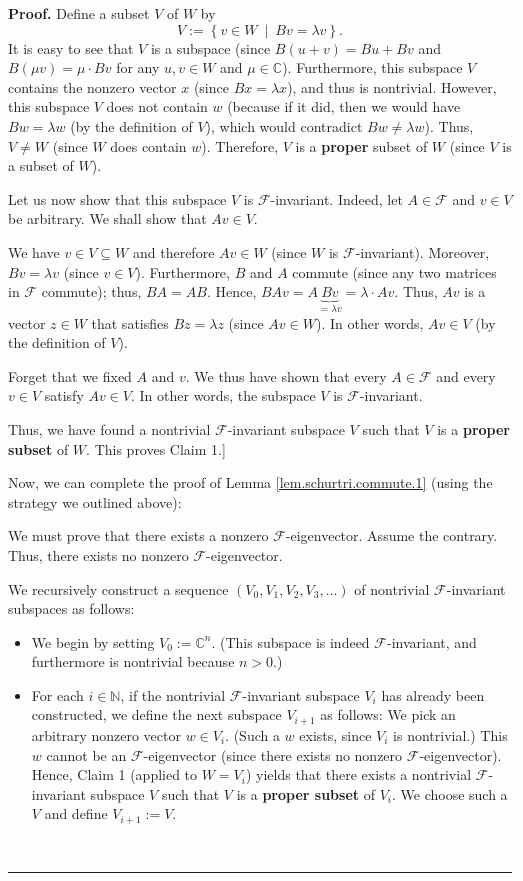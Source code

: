 \documentclass[numbers=enddot,12pt,final,onecolumn,notitlepage]{scrartcl}%
\numberwithin{exer}{subsection}
\theoremstyle{definition}
\newenvironment{proof}[1][Proof]{\noindent\textbf{#1.} }{\ \rule{0.5em}{0.5em}}
\begin{document}
\begin{proof}
Define a subset $V$ of $W$ by
\[
V:=\left\{  v\in W\ \mid\ Bv=\lambda v\right\}  .
\]
It is easy to see that $V$ is a subspace (since $B\left(  u+v\right)  =Bu+Bv$
and $B\left(  \mu v\right)  =\mu\cdot Bv$ for any $u,v\in W$ and $\mu
\in\mathbb{C}$). Furthermore, this subspace $V$ contains the nonzero vector
$x$ (since $Bx=\lambda x$), and thus is nontrivial. However, this subspace $V$
does not contain $w$ (because if it did, then we would have $Bw=\lambda w$ (by
the definition of $V$), which would contradict $Bw\neq\lambda w$). Thus,
$V\neq W$ (since $W$ does contain $w$). Therefore, $V$ is a \textbf{proper}
subset of $W$ (since $V$ is a subset of $W$).

Let us now show that this subspace $V$ is $\mathcal{F}$-invariant. Indeed, let
$A\in\mathcal{F}$ and $v\in V$ be arbitrary. We shall show that $Av\in V$.

We have $v\in V\subseteq W$ and therefore $Av\in W$ (since $W$ is
$\mathcal{F}$-invariant). Moreover, $Bv=\lambda v$ (since $v\in V$).
Furthermore, $B$ and $A$ commute (since any two matrices in $\mathcal{F}$
commute); thus, $BA=AB$. Hence, $BAv=A\underbrace{Bv}_{=\lambda v}%
=\lambda\cdot Av$. Thus, $Av$ is a vector $z\in W$ that satisfies $Bz=\lambda
z$ (since $Av\in W$). In other words, $Av\in V$ (by the definition of $V$).

Forget that we fixed $A$ and $v$. We thus have shown that every $A\in
\mathcal{F}$ and every $v\in V$ satisfy $Av\in V$. In other words, the
subspace $V$ is $\mathcal{F}$-invariant.

Thus, we have found a nontrivial $\mathcal{F}$-invariant subspace $V$ such
that $V$ is a \textbf{proper subset} of $W$. This proves Claim 1.] \medskip

Now, we can complete the proof of Lemma \ref{lem.schurtri.commute.1} (using
the strategy we outlined above):

We must prove that there exists a nonzero $\mathcal{F}$-eigenvector. Assume
the contrary. Thus, there exists no nonzero $\mathcal{F}$-eigenvector.

We recursively construct a sequence $\left(  V_{0},V_{1},V_{2},V_{3}%
,\ldots\right)  $ of nontrivial $\mathcal{F}$-invariant subspaces as follows:

\begin{itemize}
\item We begin by setting $V_{0}:=\mathbb{C}^{n}$. (This subspace is indeed
$\mathcal{F}$-invariant, and furthermore is nontrivial because $n>0$.)

\item For each $i\in\mathbb{N}$, if the nontrivial $\mathcal{F}$-invariant
subspace $V_{i}$ has already been constructed, we define the next subspace
$V_{i+1}$ as follows: We pick an arbitrary nonzero vector $w\in V_{i}$. (Such
a $w$ exists, since $V_{i}$ is nontrivial.) This $w$ cannot be an
$\mathcal{F}$-eigenvector (since there exists no nonzero $\mathcal{F}%
$-eigenvector). Hence, Claim 1 (applied to $W=V_{i}$) yields that there exists
a nontrivial $\mathcal{F}$-invariant subspace $V$ such that $V$ is a
\textbf{proper subset} of $V_{i}$. We choose such a $V$ and define
$V_{i+1}:=V$.
\end{itemize}


\end{proof}
\end{document}
